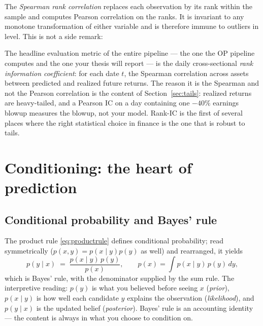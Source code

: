 \documentclass[11pt]{article}
\numberwithin{equation}{section}
\theoremstyle{plain}
\theoremstyle{definition}
\theoremstyle{remark}
\begin{document}
The \emph{Spearman rank correlation} replaces each observation by its rank within the sample and computes Pearson correlation on the ranks. It is invariant to any monotone transformation of either variable and is therefore immune to outliers in level. This is not a side remark:

\begin{necbox}
The headline evaluation metric of the entire pipeline --- the one the OP pipeline computes and the one your thesis will report --- is the daily cross-sectional \emph{rank information coefficient}: for each date $t$, the Spearman correlation across assets between predicted and realized future returns. The reason it is the Spearman and not the Pearson correlation is the content of Section~\ref{sec:tails}: realized returns are heavy-tailed, and a Pearson IC on a day containing one $-40\%$ earnings blowup measures the blowup, not your model. Rank-IC is the first of several places where the right statistical choice in finance is the one that is robust to tails.
\end{necbox}

\section{Conditioning: the heart of prediction}\label{sec:cond}

\subsection{Conditional probability and Bayes' rule}

The product rule \eqref{eq:productrule} defines conditional probability; read symmetrically ($p(x,y) = p(x \mid y)p(y)$ as well) and rearranged, it yields
\begin{equation}
p(y \mid x) \;=\; \frac{p(x \mid y)\, p(y)}{p(x)},
\qquad p(x) = \int p(x \mid y)\,p(y)\,dy,
\label{eq:bayes}
\end{equation}
which is Bayes' rule, with the denominator supplied by the sum rule. The interpretive reading: $p(y)$ is what you believed before seeing $x$ (\emph{prior}), $p(x \mid y)$ is how well each candidate $y$ explains the observation (\emph{likelihood}), and $p(y \mid x)$ is the updated belief (\emph{posterior}). Bayes' rule is an accounting identity --- the content is always in what you choose to condition on.
\end{document}
